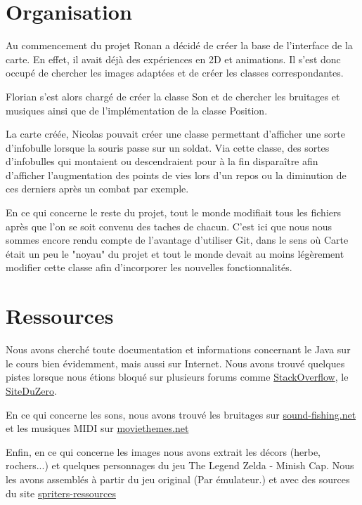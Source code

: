 \documentclass{article}
\begin{document}

\section{Organisation}
Au commencement du projet Ronan a décidé de créer la base de l'interface de la carte.
En effet, il avait déjà des expériences en 2D et animations.
Il s'est donc occupé de chercher les images adaptées et de créer les classes correspondantes.

Florian s'est alors chargé de créer la classe Son et de chercher les bruitages et musiques ainsi que de l'implémentation de la classe Position.

La carte créée, Nicolas pouvait créer une classe permettant d'afficher une sorte d'infobulle lorsque la souris passe sur un soldat.
Via cette classe, des sortes d'infobulles qui montaient ou descendraient pour à la fin disparaître afin d'afficher l'augmentation des points de vies lors d'un repos ou la diminution de ces derniers après un combat par exemple.

En ce qui concerne le reste du projet, tout le monde modifiait tous les fichiers après que l'on se soit convenu des taches de chacun.
C'est ici que nous nous sommes encore rendu compte de l'avantage d'utiliser Git, dans le sens où Carte était un peu le "noyau" du projet et tout le monde devait au moins légèrement modifier cette classe afin d'incorporer les nouvelles fonctionnalités.

\section{Ressources}
Nous avons cherché toute documentation et informations concernant le Java sur le cours bien évidemment, mais aussi sur Internet.
Nous avons trouvé quelques pistes lorsque nous étions bloqué sur plusieurs forums comme \href{http://stackoverflow.com}{StackOverflow}, le \href{http://siteduzero.com}{SiteDuZero}.

En ce qui concerne les sons, nous avons trouvé les bruitages sur \href{http://www.sound-fishing.net}{sound-fishing.net} et les musiques MIDI sur \href{http://moviethemes.net/lord-rings.html}{moviethemes.net}

Enfin, en ce qui concerne les images nous avons extrait les décors (herbe, rochers...) et quelques personnages du jeu The Legend Zelda - Minish Cap. Nous les avons assemblés à partir du jeu original (Par émulateur.) et avec des sources du site \href{http://www.spriters-resource.com/}{spriters-ressources}
\end{document}
